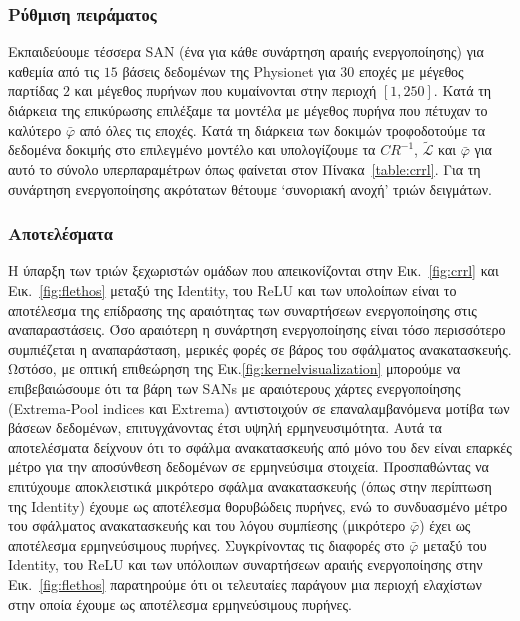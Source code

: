 \subsubsection{Ρύθμιση πειράματος}
Εκπαιδεύουμε τέσσερα SAN (ένα για κάθε συνάρτηση αραιής ενεργοποίησης) για καθεμία από τις $15$ βάσεις δεδομένων της Physionet για $30$ εποχές με μέγεθος παρτίδας $2$ και μέγεθος πυρήνων που κυμαίνονται στην περιοχή $[1, 250]$.
Κατά τη διάρκεια της επικύρωσης επιλέξαμε τα μοντέλα με μέγεθος πυρήνα που πέτυχαν το καλύτερο $\bar\varphi$ από όλες τις εποχές.
Κατά τη διάρκεια των δοκιμών τροφοδοτούμε τα δεδομένα δοκιμής στο επιλεγμένο μοντέλο και υπολογίζουμε τα $CR^{-1}$, $\tilde{\mathcal{L}}$ και $\bar\varphi$ για αυτό το σύνολο υπερπαραμέτρων όπως φαίνεται στον Πίνακα~\ref{table:crrl}.
Για τη συνάρτηση ενεργοποίησης ακρότατων θέτουμε `συνοριακή ανοχή' τριών δειγμάτων.

\subsubsection{Αποτελέσματα}
Η ύπαρξη των τριών ξεχωριστών ομάδων που απεικονίζονται στην Εικ.~\ref{fig:crrl} και Εικ.~\ref{fig:flethos} μεταξύ της Identity, του ReLU και των υπολοίπων είναι το αποτέλεσμα της επίδρασης της αραιότητας των συναρτήσεων ενεργοποίησης στις αναπαραστάσεις.
Όσο αραιότερη η συνάρτηση ενεργοποίησης είναι τόσο περισσότερο συμπιέζεται η αναπαράσταση, μερικές φορές σε βάρος του σφάλματος ανακατασκευής.
Ωστόσο, με οπτική επιθεώρηση της Εικ.\ref{fig:kernelvisualization} μπορούμε να επιβεβαιώσουμε ότι τα βάρη των SANs με αραιότερους χάρτες ενεργοποίησης (Extrema-Pool indices και Extrema) αντιστοιχούν σε επαναλαμβανόμενα μοτίβα των βάσεων δεδομένων, επιτυγχάνοντας έτσι υψηλή ερμηνευσιμότητα.
Αυτά τα αποτελέσματα δείχνουν ότι το σφάλμα ανακατασκευής από μόνο του δεν είναι επαρκές μέτρο για την αποσύνθεση δεδομένων σε ερμηνεύσιμα στοιχεία.
Προσπαθώντας να επιτύχουμε αποκλειστικά μικρότερο σφάλμα ανακατασκευής (όπως στην περίπτωση της Identity) έχουμε ως αποτέλεσμα θορυβώδεις πυρήνες, ενώ το συνδυασμένο μέτρο του σφάλματος ανακατασκευής και του λόγου συμπίεσης (μικρότερο $\bar\varphi$) έχει ως αποτέλεσμα ερμηνεύσιμους πυρήνες.
Συγκρίνοντας τις διαφορές στο $\bar\varphi$ μεταξύ του Identity, του ReLU και των υπόλοιπων συναρτήσεων αραιής ενεργοποίησης στην Εικ.~\ref{fig:flethos} παρατηρούμε ότι οι τελευταίες παράγουν μια περιοχή ελαχίστων στην οποία έχουμε ως αποτέλεσμα ερμηνεύσιμους πυρήνες.

